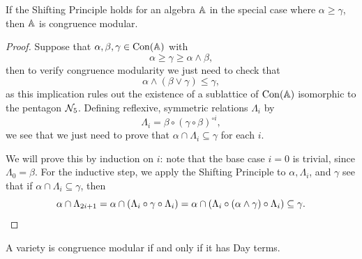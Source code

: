 \begin{appendices}
\begin{lem} If the Shifting Principle holds for an algebra $\mathbb{A}$ in the special case where $\alpha \ge \gamma$, then $\mathbb{A}$ is congruence modular.
\end{lem}
\begin{proof} Suppose that $\alpha, \beta, \gamma \in \operatorname{Con}(\mathbb{A})$ with
\[
\alpha \ge \gamma \ge \alpha \wedge \beta,
\]
then to verify congruence modularity we just need to check that
\[
\alpha \wedge (\beta \vee \gamma) \le \gamma,
\]
as this implication rules out the existence of a sublattice of $\operatorname{Con}(\mathbb{A})$ isomorphic to the pentagon $\mathcal{N}_5$. Defining reflexive, symmetric relations $\Lambda_i$ by
\[
\Lambda_i = \beta\circ (\gamma\circ\beta)^{\circ i},
\]
we see that we just need to prove that $\alpha \cap \Lambda_i \subseteq \gamma$ for each $i$.

We will prove this by induction on $i$: note that the base case $i = 0$ is trivial, since $\Lambda_0 = \beta$. For the inductive step, we apply the Shifting Principle to $\alpha, \Lambda_i$, and $\gamma$ see that if $\alpha \cap \Lambda_i \subseteq \gamma$, then
\[
\alpha \cap \Lambda_{2i+1} = \alpha \cap (\Lambda_i \circ \gamma \circ \Lambda_i) = \alpha \cap (\Lambda_i \circ (\alpha\wedge \gamma) \circ \Lambda_i) \subseteq \gamma.\qedhere
\]
\end{proof}

\begin{cor} A variety is congruence modular if and only if it has Day terms.
\end{cor}

\end{appendices}
